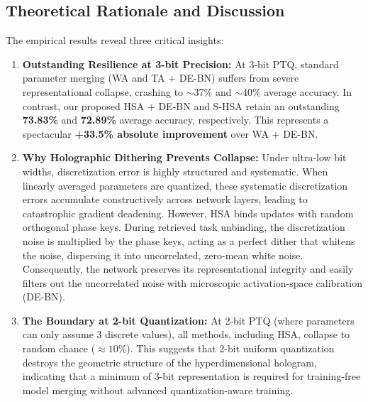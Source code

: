 \documentclass{article}
\theoremstyle{plain}
\theoremstyle{definition}
\theoremstyle{remark}
\begin{document}
\subsection{Theoretical Rationale and Discussion}
The empirical results reveal three critical insights:
\begin{enumerate}
    \item \textbf{Outstanding Resilience at 3-bit Precision:} At 3-bit PTQ, standard parameter merging (WA and TA + DE-BN) suffers from severe representational collapse, crashing to $\sim$37\% and $\sim$40\% average accuracy. In contrast, our proposed HSA + DE-BN and S-HSA retain an outstanding \textbf{73.83\%} and \textbf{72.89\%} average accuracy, respectively. This represents a spectacular \textbf{+33.5\% absolute improvement} over WA + DE-BN.
    \item \textbf{Why Holographic Dithering Prevents Collapse:} Under ultra-low bit widths, discretization error is highly structured and systematic. When linearly averaged parameters are quantized, these systematic discretization errors accumulate constructively across network layers, leading to catastrophic gradient deadening. However, HSA binds updates with random orthogonal phase keys. During retrieved task unbinding, the discretization noise is multiplied by the phase keys, acting as a perfect dither that whitens the noise, dispersing it into uncorrelated, zero-mean white noise. Consequently, the network preserves its representational integrity and easily filters out the uncorrelated noise with microscopic activation-space calibration (DE-BN).
    \item \textbf{The Boundary at 2-bit Quantization:} At 2-bit PTQ (where parameters can only assume 3 discrete values), all methods, including HSA, collapse to random chance ($\approx 10\%$). This suggests that 2-bit uniform quantization destroys the geometric structure of the hyperdimensional hologram, indicating that a minimum of 3-bit representation is required for training-free model merging without advanced quantization-aware training.
\end{enumerate}
\end{document}
